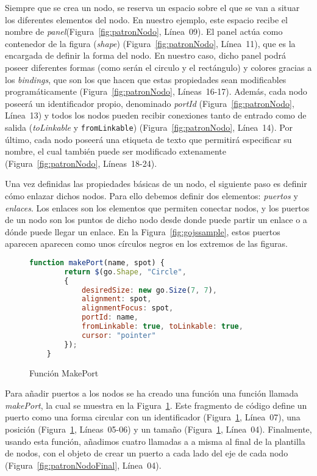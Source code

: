 Siempre que se crea un nodo, se reserva un espacio sobre el que se van a situar los diferentes elementos del nodo. En nuestro ejemplo, este espacio recibe el nombre de \emph{panel}(Figura~\ref{fig:patronNodo}, Línea~09). El panel actúa como contenedor de la figura (\emph{shape}) (Figura~\ref{fig:patronNodo}, Línea~11), que es la encargada de definir la forma del nodo. En nuestro caso, dicho panel podrá poseer diferentes formas (como serán el circulo y el rectángulo) y colores gracias a los \emph{bindings}, que son los que hacen que estas propiedades sean modificables programáticamente (Figura~\ref{fig:patronNodo}, Líneas~16-17). Además, cada nodo poseerá un identificador propio, denominado \emph{portId} (Figura~\ref{fig:patronNodo}, Línea~13) y todos los nodos pueden recibir conexiones tanto de entrado como de salida (\emph{toLinkable} y \texttt{fromLinkable}) (Figura~\ref{fig:patronNodo}, Línea~14). Por último, cada nodo poseerá una etiqueta de texto que permitirá especificar su nombre, el cual también puede ser modificado extenamente (Figura~\ref{fig:patronNodo}, Líneas~18-24).

Una vez definidas las propiedades básicas de un nodo, el siguiente paso es definir cómo enlazar dichos nodos. Para ello debemos definir dos elementos: \emph{puertos} y \emph{enlaces}. Los enlaces son los elementos que permiten conectar nodos, y los puertos de un nodo son los puntos de dicho nodo desde donde puede partir un enlace o a dónde puede llegar un enlace.  En la Figura~\ref{fig:gojssample}, estos puertos aparecen aparecen como unos círculos negros en los extremos de las figuras.

\begin{figure}[!tb]
	\centering
	\begin{lstlisting}[language=JavaScript]
	function makePort(name, spot) {
		return $(go.Shape, "Circle",
		{
			desiredSize: new go.Size(7, 7),
			alignment: spot,
			alignmentFocus: spot,
			portId: name,
			fromLinkable: true, toLinkable: true,
			cursor: "pointer"
		});
	}\end{lstlisting}
	\caption{Función MakePort}
	\label{fig:funcionMakeport}
\end{figure}
	
Para añadir puertos a los nodos se ha creado una función una función llamada \emph{makePort}, la cual se muestra en la Figura~\ref{fig:funcionMakeport}. Este fragmento de código define un puerto como una forma circular con un identificador (Figura~\ref{fig:funcionMakeport}, Línea~07), una posición (Figura~\ref{fig:funcionMakeport}, Líneas~05-06) y un tamaño (Figura~\ref{fig:funcionMakeport}, Línea~04). Finalmente, usando esta función, añadimos cuatro llamadas a a misma al final de la plantilla de nodos, con el objeto de crear un puerto a cada lado del eje de cada nodo (Figura~\ref{fig:patronNodoFinal}, Línea~04).

